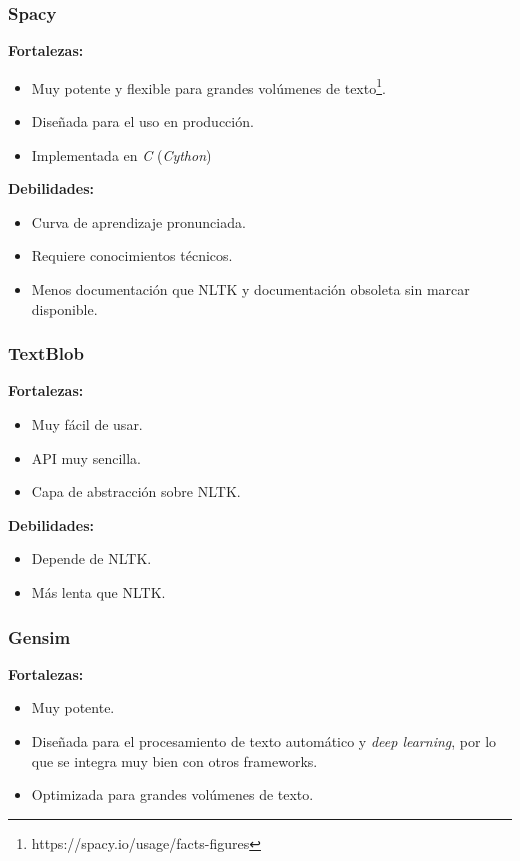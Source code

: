 \documentclass[a4paper,twocolumn]{article}
\begin{document}
    \subsubsection{Spacy}\label{subsubsec:spacy}

    \textbf{Fortalezas:}
    \begin{itemize}
        \item Muy potente y flexible para grandes volúmenes de texto\footnote{https://spacy.io/usage/facts-figures}.
        \item Diseñada para el uso en producción.
        \item Implementada en \textit{C} (\textit{Cython})\cite{spacy.cython}
    \end{itemize}

    \textbf{Debilidades:}
    \begin{itemize}
        \item Curva de aprendizaje pronunciada.
        \item Requiere conocimientos técnicos.
        \item Menos documentación que NLTK y documentación obsoleta sin marcar disponible.
    \end {itemize}

    \subsubsection{TextBlob}\label{subsubsec:textblob}

    \textbf{Fortalezas:}
    \begin{itemize}
        \item Muy fácil de usar.
        \item API muy sencilla.
        \item Capa de abstracción sobre NLTK\@.
    \end {itemize}

    \textbf{Debilidades:}
    \begin{itemize}
        \item Depende de NLTK\@.
        \item Más lenta que NLTK\@.
    \end {itemize}

    \subsubsection{Gensim}\label{subsubsec:gensim}

    \textbf{Fortalezas:}
    \begin{itemize}
        \item Muy potente.
        \item Diseñada para el procesamiento de texto automático y \textit{deep learning}, por lo que se integra muy bien con otros frameworks.
        \item Optimizada para grandes volúmenes de texto.
    \end {itemize}
\end{document}
